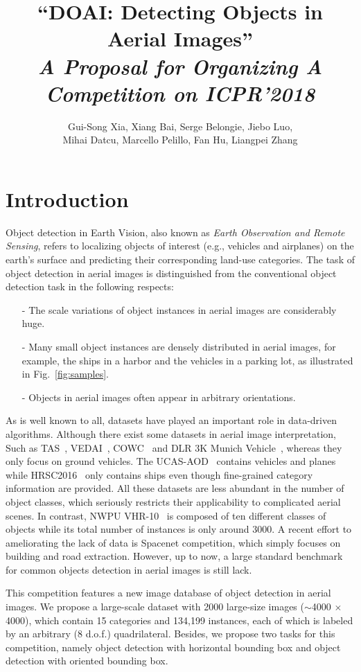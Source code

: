 \documentclass[a4paper]{article}
\title{``DOAI: Detecting Objects in Aerial Images''\\
{\em A Proposal for Organizing A Competition on ICPR'2018}}
\author{Gui-Song Xia, Xiang Bai, Serge Belongie, Jiebo Luo, \\ Mihai Datcu, Marcello Pelillo, Fan Hu, Liangpei Zhang}
\begin{document}
\maketitle

\section{Introduction}
Object detection in Earth Vision, also known as {\em Earth Observation and Remote Sensing}, refers to localizing objects of interest (e.g., vehicles and airplanes) on the earth’s surface and predicting their corresponding land-use categories. %
The task of object detection in aerial images is distinguished from the conventional object detection task in the following respects:
\begin{itemize}
	\item[-] The scale variations of object instances in aerial images are considerably huge.
	\item[-] Many small object instances are densely distributed in aerial images, for example, the ships in a harbor and the vehicles in a parking lot, as illustrated in Fig.~\ref{fig:samples}.
	\item[-] Objects in aerial images often appear in arbitrary orientations.
\end{itemize}

As is well known to all, datasets have played an important role in data-driven algorithms. Although there exist some datasets in aerial image interpretation, Such as TAS~\cite{TAS}, VEDAI~\cite{VEDAI}, COWC~\cite{COWC} and DLR 3K Munich Vehicle~\cite{DLR3KMunichVehicle}, whereas they only focus on ground vehicles. The UCAS-AOD~\cite{ucas-aod} contains vehicles and planes while HRSC2016~\cite{HRSC2016} only contains ships even though fine-grained category information are provided. All these datasets are less abundant in the number of object classes, which seriously restricts their applicability to complicated aerial scenes. In contrast, NWPU VHR-10~\cite{VHR} is composed of ten different classes of objects while its total number of instances is only around $3000$. A recent effort to ameliorating the lack of data is Spacenet competition, which simply focuses on building and road extraction. However, up to now, a large standard benchmark for common objects detection in aerial images is still lack.

This competition features a new image database of object detection in aerial images. We propose a large-scale dataset with 2000 large-size images ($\sim$4000 $\times$4000), which contain 15 categories and 134,199 instances, each of which is labeled by an arbitrary (8 d.o.f.) quadrilateral. Besides, we propose two tasks for this competition, namely object detection with horizontal bounding box and object detection with oriented bounding box.
\end{document}
